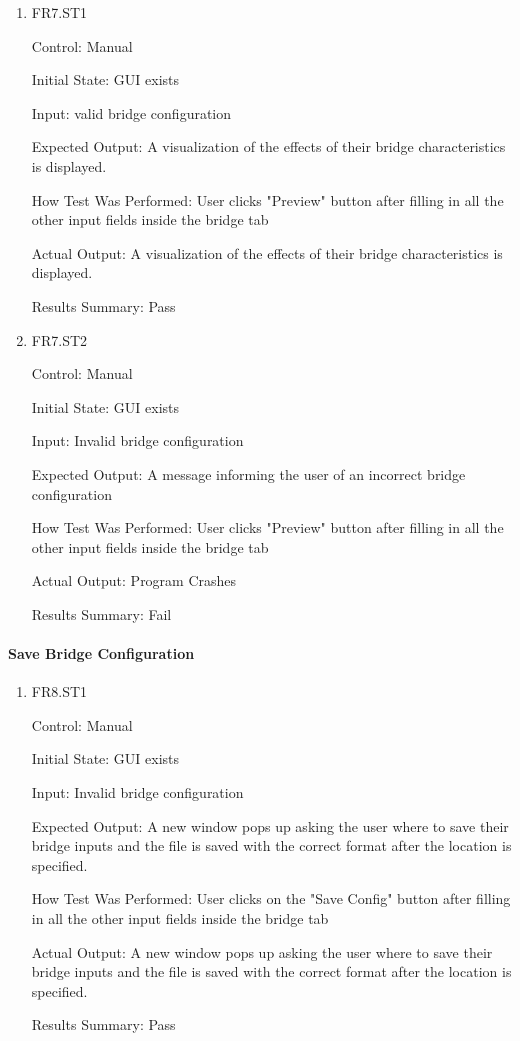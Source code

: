 \documentclass[12pt, titlepage]{article}
\begin{document}
\begin{enumerate}
  
  \item{FR7.ST1\\}
  
  Control: Manual
  
  Initial State: GUI exists
  
  Input: valid bridge configuration
  
  Expected Output: A visualization of the effects of their bridge characteristics is displayed. 
  
  How Test Was Performed: User clicks "Preview" button after filling in all the other input fields inside the bridge tab
  
  Actual Output: A visualization of the effects of their bridge characteristics is displayed.
  
  Results Summary: Pass
  
  \item{FR7.ST2\\}
  
  Control: Manual
  
  Initial State: GUI exists
  
  Input: Invalid bridge configuration
  
   Expected Output: A message informing the user of an incorrect bridge configuration
  
  How Test Was Performed: User clicks "Preview" button after filling in all the other input fields inside the bridge tab

  Actual Output: Program Crashes
    
  Results Summary: Fail 
  
\end{enumerate}

\paragraph{Save Bridge Configuration}

\begin{enumerate}

  \item{FR8.ST1\\}
  
  Control: Manual
  
  Initial State: GUI exists
  
  Input: Invalid bridge configuration
  
  Expected Output: A new window pops up asking the user where to save their bridge inputs and the file is saved with the correct format after the location is specified. 
  
  How Test Was Performed: User clicks on the "Save Config" button after filling in all the other input fields inside the bridge tab

  Actual Output: A new window pops up asking the user where to save their bridge inputs and the file is saved with the correct format after the location is specified.
    
  Results Summary: Pass

\end{enumerate}
\end{document}
